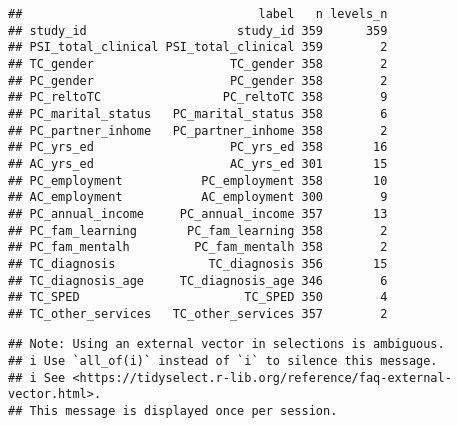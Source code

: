 \documentclass[
]{article}
\newenvironment{Shaded}{\begin{snugshade}}{\end{snugshade}}
\newcommand{\CommentTok}[1]{\textcolor[rgb]{0.56,0.35,0.01}{\textit{#1}}}
\newcommand{\ControlFlowTok}[1]{\textcolor[rgb]{0.13,0.29,0.53}{\textbf{#1}}}
\newcommand{\FunctionTok}[1]{\textcolor[rgb]{0.00,0.00,0.00}{#1}}
\newcommand{\NormalTok}[1]{#1}
\newcommand{\OtherTok}[1]{\textcolor[rgb]{0.56,0.35,0.01}{#1}}
\newcommand{\SpecialCharTok}[1]{\textcolor[rgb]{0.00,0.00,0.00}{#1}}
\begin{document}
\begin{Shaded}
\end{Shaded}

\begin{verbatim}
##                                 label   n levels_n
## study_id                     study_id 359      359
## PSI_total_clinical PSI_total_clinical 359        2
## TC_gender                   TC_gender 358        2
## PC_gender                   PC_gender 358        2
## PC_reltoTC                 PC_reltoTC 358        9
## PC_marital_status   PC_marital_status 358        6
## PC_partner_inhome   PC_partner_inhome 358        2
## PC_yrs_ed                   PC_yrs_ed 358       16
## AC_yrs_ed                   AC_yrs_ed 301       15
## PC_employment           PC_employment 358       10
## AC_employment           AC_employment 300        9
## PC_annual_income     PC_annual_income 357       13
## PC_fam_learning       PC_fam_learning 358        2
## PC_fam_mentalh         PC_fam_mentalh 358        2
## TC_diagnosis             TC_diagnosis 356       15
## TC_diagnosis_age     TC_diagnosis_age 346        6
## TC_SPED                       TC_SPED 350        4
## TC_other_services   TC_other_services 357        2
\end{verbatim}

\begin{Shaded}
\end{Shaded}

\begin{verbatim}
## Note: Using an external vector in selections is ambiguous.
## i Use `all_of(i)` instead of `i` to silence this message.
## i See <https://tidyselect.r-lib.org/reference/faq-external-vector.html>.
## This message is displayed once per session.
\end{verbatim}
\end{document}
